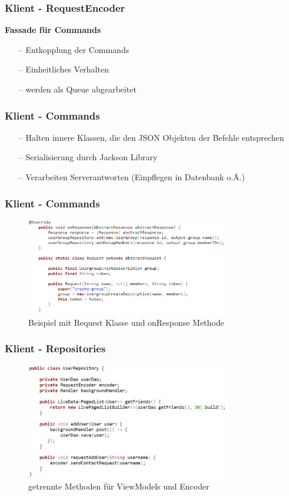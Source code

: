 \documentclass[aspectratio=1610]{beamer}
\begin{document}
	\begin{frame}[plain]
	\frametitle{Klient - RequestEncoder}
	\textbf{Fassade für Commands}
	\begin{itemize}
		\setlength\itemsep{0.3em}
		\item[--] Entkopplung der Commands
		\item[--] Einheitliches Verhalten
		\item[--] werden als Queue abgearbeitet
 	\end{itemize}
	\end{frame}
	
	\begin{frame}[plain]
	\frametitle{Klient - Commands}
	\begin{itemize}
		\setlength\itemsep{0.3em}
		\item[--] Halten innere Klassen, die den JSON Objekten der Befehle entsprechen
		\item[--] Serialisierung durch Jackson Library
		\item[--] Verarbeiten Serverantworten (Einpflegen in Datenbank o.Ä.)
 	\end{itemize}
	\end{frame}
	
	\begin{frame}[plain]
	\frametitle{Klient - Commands}
	\begin{figure}[h]
		\centering
		\includegraphics[width=0.8\textwidth]{images/CreateGroupCommand.PNG}
		\caption{Beispiel mit Request Klasse und onResponse Methode}
	\end{figure}
	\end{frame}

	\begin{frame}[plain]
	\frametitle{Klient - Repositories}
	\begin{figure}[h]
		\centering
		\includegraphics[width=0.8\textwidth]{images/UserRepository.PNG}
		\caption{getrennte Methoden für ViewModels und Encoder}
	\end{figure}
	\end{frame}
\end{document}
